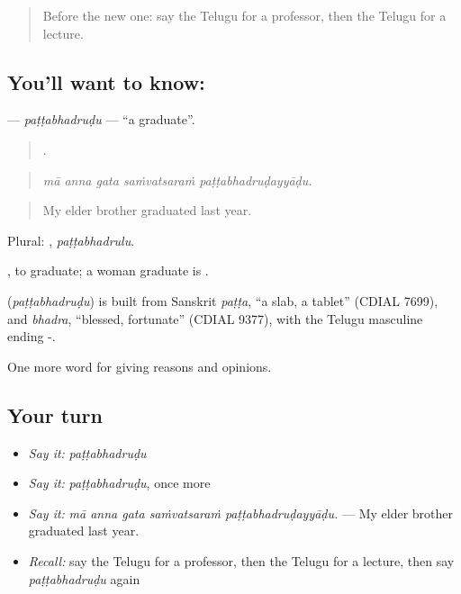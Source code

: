 \label{lesson:TE-C414-pattabhadrudu}



\begin{quote}
Before the new one: say the Telugu for a professor, then the Telugu for a lecture.
\end{quote}

\subsection*{You'll want to know: }
\textbf{} — \emph{paṭṭabhadruḍu} — \textquotedblleft{}a graduate\textquotedblright{}.

\begin{quote}
    .
\end{quote}

\begin{quote}
\emph{mā anna gata saṁvatsaraṁ paṭṭabhadruḍayyāḍu.}
\end{quote}

\begin{quote}
My elder brother graduated last year.
\end{quote}

Plural: , \emph{paṭṭabhadrulu}.

 , to graduate; a woman graduate is .

\begin{cousinweb}
\textbf{} (\emph{paṭṭabhadruḍu}) is built from Sanskrit \emph{paṭṭa}, \textquotedblleft{}a slab, a tablet\textquotedblright{} (CDIAL 7699), and \emph{bhadra}, \textquotedblleft{}blessed, fortunate\textquotedblright{} (CDIAL 9377), with the Telugu masculine ending -.
\end{cousinweb}

\begin{grammarlens}[title={What you've built}]
One more word for giving reasons and opinions.
\end{grammarlens}

\subsection*{Your turn}
\begin{itemize}
\raggedright
  \item \emph{Say it:} \emph{paṭṭabhadruḍu}
  \item \emph{Say it:} \emph{paṭṭabhadruḍu}, once more
  \item \emph{Say it:} \emph{mā anna gata saṁvatsaraṁ paṭṭabhadruḍayyāḍu.} — My elder brother graduated last year.
  \item \emph{Recall:} say the Telugu for a professor, then the Telugu for a lecture, then say \emph{paṭṭabhadruḍu} again
\end{itemize}

